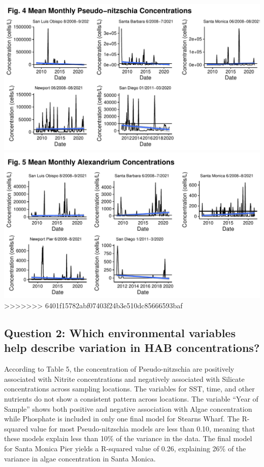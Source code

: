 \documentclass[
  12pt,
]{article}
\begin{document}
\includegraphics{Habs_Final_Report_files/figure-latex/combining figures-1.pdf}
\includegraphics{Habs_Final_Report_files/figure-latex/combining figures-2.pdf}
>>>>>>> 6401f15782abf07403f24b3e510dc85666593baf

\newpage

\hypertarget{question-2-which-environmental-variables-help-describe-variation-in-hab-concentrations}{%
\subsection{Question 2: Which environmental variables help describe
variation in HAB
concentrations?}\label{question-2-which-environmental-variables-help-describe-variation-in-hab-concentrations}}

According to Table 5, the concentration of Pseudo-nitzschia are
positively associated with Nitrite concentrations and negatively
associated with Silicate concentrations across sampling locations. The
variables for SST, time, and other nutrients do not show a consistent
pattern across locations. The variable ``Year of Sample'' shows both
positive and negative association with Algae concentration while
Phosphate is included in only one final model for Stearns Wharf. The
R-squared value for most Pseudo-nitzschia models are less than 0.10,
meaning that these models explain less than 10\% of the variance in the
data. The final model for Santa Monica Pier yields a R-squared value of
0.26, explaining 26\% of the variance in algae concentration in Santa
Monica.
\end{document}
